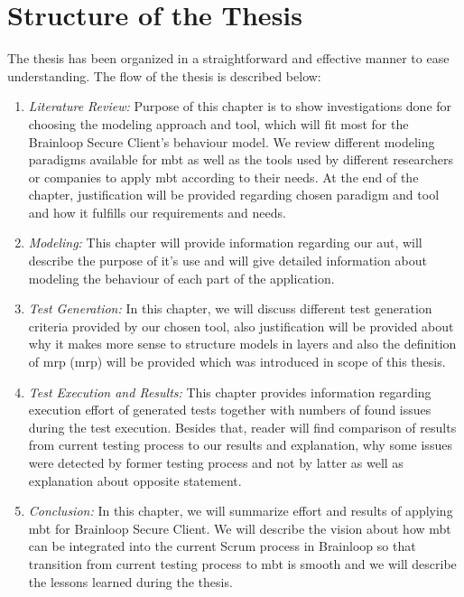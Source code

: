 \section{Structure of the Thesis}
The thesis has been organized in a straightforward and effective manner to ease understanding. The flow of the thesis is described below:

\begin{enumerate}

\item \textit{Literature Review: }
Purpose of this chapter is to show investigations done for choosing the modeling approach and tool, which will fit most for the Brainloop Secure Client’s behaviour model. We review different modeling paradigms available for \acrshort{mbt} as well as the tools used by different researchers or companies to apply \acrshort{mbt} according to their needs. At the end of the chapter, justification will be provided regarding chosen paradigm and tool and how it fulfills our requirements and needs.

\item \textit{Modeling: } This chapter will provide information regarding our \acrlong{aut}, will describe the purpose of it's use and will give detailed information about modeling the behaviour of each part of the application.

\item \textit{Test Generation: } In this chapter, we will discuss different test generation criteria provided by our chosen tool, also justification will be provided about why it makes more sense to structure models in layers and also the definition of \acrshort{mrp} (\acrlong{mrp}) will be provided which was introduced in scope of this thesis.

\item \textit{Test Execution and Results: } This chapter provides information regarding execution effort of generated tests together with numbers of found issues during the test execution. Besides that, reader will find comparison of results from current testing process to our results and explanation, why some issues were detected by former testing process and not by latter as well as explanation about opposite statement.

\item \textit{Conclusion:  }In this chapter, we will summarize effort and results of applying \acrshort{mbt} for Brainloop Secure Client. We will describe the vision about how \acrshort{mbt} can be integrated into the current Scrum process in Brainloop so that transition from current testing process to \acrshort{mbt} is smooth and we will describe the lessons learned during the thesis.


\end{enumerate}
